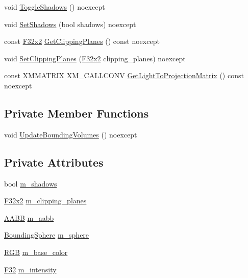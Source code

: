 \begin{DoxyCompactItemize}
\item 
void \mbox{\hyperlink{classmage_1_1rendering_1_1_omni_light_aa1816fad8913711c10994b66103279a2}{Toggle\+Shadows}} () noexcept
\item 
void \mbox{\hyperlink{classmage_1_1rendering_1_1_omni_light_a2817ab7a4c514785f01bf2e40c6245cb}{Set\+Shadows}} (bool shadows) noexcept
\item 
const \mbox{\hyperlink{namespacemage_a9dc0d34d6ecc87e4cfa4a826102117bc}{F32x2}} \mbox{\hyperlink{classmage_1_1rendering_1_1_omni_light_a30b6cbf1fd7a6058856a491c2ce75005}{Get\+Clipping\+Planes}} () const noexcept
\item 
void \mbox{\hyperlink{classmage_1_1rendering_1_1_omni_light_af1334671baf6f5afeb297fb819118639}{Set\+Clipping\+Planes}} (\mbox{\hyperlink{namespacemage_a9dc0d34d6ecc87e4cfa4a826102117bc}{F32x2}} clipping\+\_\+planes) noexcept
\item 
const X\+M\+M\+A\+T\+R\+IX X\+M\+\_\+\+C\+A\+L\+L\+C\+O\+NV \mbox{\hyperlink{classmage_1_1rendering_1_1_omni_light_aa93d9722b3480fc9997761af89a6d90d}{Get\+Light\+To\+Projection\+Matrix}} () const noexcept
\end{DoxyCompactItemize}
\subsection*{Private Member Functions}
\begin{DoxyCompactItemize}
\item 
void \mbox{\hyperlink{classmage_1_1rendering_1_1_omni_light_a44c6dee7d24c879aab0284ac21910337}{Update\+Bounding\+Volumes}} () noexcept
\end{DoxyCompactItemize}
\subsection*{Private Attributes}
\begin{DoxyCompactItemize}
\item 
bool \mbox{\hyperlink{classmage_1_1rendering_1_1_omni_light_af0cb508d0333f86cf64c28f5628177d4}{m\+\_\+shadows}}
\item 
\mbox{\hyperlink{namespacemage_a9dc0d34d6ecc87e4cfa4a826102117bc}{F32x2}} \mbox{\hyperlink{classmage_1_1rendering_1_1_omni_light_a725388093feb1e5ed2ebce4f70c1729b}{m\+\_\+clipping\+\_\+planes}}
\item 
\mbox{\hyperlink{classmage_1_1_a_a_b_b}{A\+A\+BB}} \mbox{\hyperlink{classmage_1_1rendering_1_1_omni_light_ac2b5bb2e28364445c7bce70c8fa1374e}{m\+\_\+aabb}}
\item 
\mbox{\hyperlink{classmage_1_1_bounding_sphere}{Bounding\+Sphere}} \mbox{\hyperlink{classmage_1_1rendering_1_1_omni_light_af11a99e2b1500093b9bd0e3ff16b04e6}{m\+\_\+sphere}}
\item 
\mbox{\hyperlink{structmage_1_1_r_g_b}{R\+GB}} \mbox{\hyperlink{classmage_1_1rendering_1_1_omni_light_ac5aca97b5729d9c0856ed08f64976edf}{m\+\_\+base\+\_\+color}}
\item 
\mbox{\hyperlink{namespacemage_aa97e833b45f06d60a0a9c4fc22ae02c0}{F32}} \mbox{\hyperlink{classmage_1_1rendering_1_1_omni_light_af7ba6e05e5809d16ec070a2b2de47a62}{m\+\_\+intensity}}
\end{DoxyCompactItemize}
